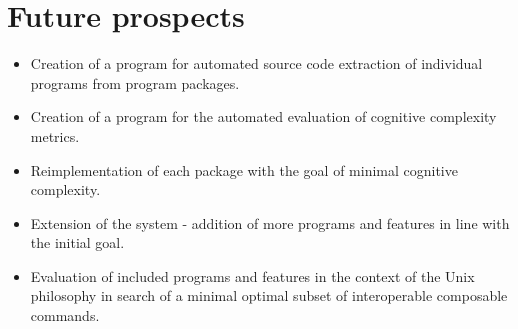 \section{Future prospects}\label{Future prospects}

\begin{itemize}
    \item Creation of a program for automated source code extraction of individual programs from program packages.
    \item Creation of a program for the automated evaluation of cognitive complexity metrics.
    \item Reimplementation of each package with the goal of minimal cognitive complexity.
    \item Extension of the system - addition of more programs and features in line with the initial goal.
    \item Evaluation of included programs and features in the context of the Unix philosophy in search of a minimal optimal subset of interoperable composable commands.
\end{itemize}
